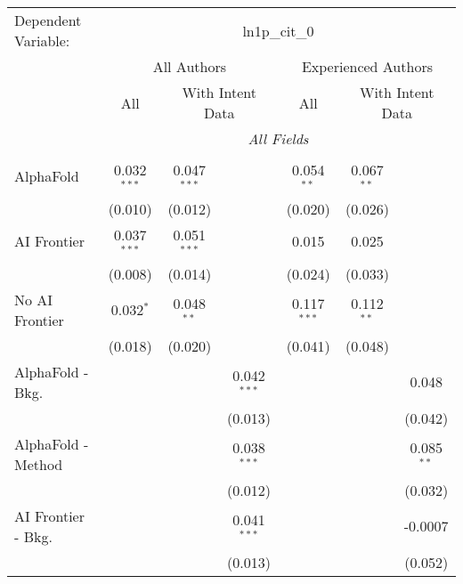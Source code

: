 \begingroup
\centering
\begin{tabular}{lcccccc}
   \tabularnewline \midrule \midrule
   Dependent Variable: & \multicolumn{6}{c}{ln1p\_cit\_0}\\
 & \multicolumn{3}{c}{All Authors} & \multicolumn{3}{c}{Experienced Authors} \\
\cmidrule(lr){2-4} \cmidrule(lr){5-7}
 & \multicolumn{1}{c}{All} & \multicolumn{2}{c}{With Intent Data} & \multicolumn{1}{c}{All} & \multicolumn{2}{c}{With Intent Data} \\
\cmidrule(lr){2-2} \cmidrule(lr){3-4} \cmidrule(lr){5-5} \cmidrule(lr){6-7}
 & \multicolumn{6}{c}{\textit{All Fields}} \\ \\
   AlphaFold               & 0.032$^{***}$ & 0.047$^{***}$ &               & 0.054$^{**}$  & 0.067$^{**}$ &   \\   
                           & (0.010)       & (0.012)       &               & (0.020)       & (0.026)      &   \\   
   AI Frontier             & 0.037$^{***}$ & 0.051$^{***}$ &               & 0.015         & 0.025        &   \\   
                           & (0.008)       & (0.014)       &               & (0.024)       & (0.033)      &   \\   
   No AI Frontier          & 0.032$^{*}$   & 0.048$^{**}$  &               & 0.117$^{***}$ & 0.112$^{**}$ &   \\   
                           & (0.018)       & (0.020)       &               & (0.041)       & (0.048)      &   \\   
   AlphaFold - Bkg.        &               &               & 0.042$^{***}$ &               &              & 0.048\\   
                           &               &               & (0.013)       &               &              & (0.042)\\   
   AlphaFold - Method      &               &               & 0.038$^{***}$ &               &              & 0.085$^{**}$\\   
                           &               &               & (0.012)       &               &              & (0.032)\\   
   AI Frontier - Bkg.      &               &               & 0.041$^{***}$ &               &              & -0.0007\\   
                           &               &               & (0.013)       &               &              & (0.052)\\   

\end{tabular}
